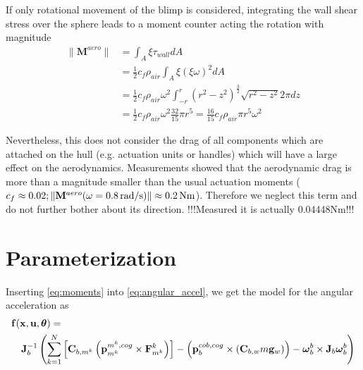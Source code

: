 If only rotational movement of the blimp is considered, integrating the wall shear stress over the sphere leads to a moment counter acting the rotation with magnitude
\begin{align*}
\| \mathbf{M}^{aero} \|
&= \int_A \xi \tau_{wall} dA \\
&= \frac{1}{2} c_f \rho_{air} \int_A \xi (\xi \omega)^2 dA \\
&= \frac{1}{2} c_f \rho_{air} \omega^2 \int_{-r}^{r} (r^2-z^2)^{\frac{3}{2}} \sqrt{r^2-z^2} 2\pi dz \\
&= \frac{1}{2} c_f \rho_{air} \omega^2 \frac{32}{15} \pi r^5
 = \frac{16}{15} c_f \rho_{air} \pi r^5 \omega^2
\end{align*}

Nevertheless, this does not consider the drag of all components which are attached on the hull (e.g. actuation units or handles) which will have a large effect on the aerodynamics.
Measurements showed that the aerodynamic drag is more than a magnitude smaller than the usual actuation moments ($c_f \approx 0.02; \|\mathbf{M}^{aero}(\omega = \unit[0.8]{rad/s})\| \approx \unit[0.2]{Nm}$). Therefore we neglect this term and do not further bother about its direction.
!!!Measured it is actually 0.04448Nm!!!

%
%

\section{Parameterization}
Inserting \cref{eq:moments} into \cref{eq:angular_accel}, we get the model for the angular acceleration as
\begin{align}
\lefteqn{ \mathbf{f}(\mathbf{x}, \mathbf{u}, \boldsymbol{\theta}) = {} \label{eq:sys_mod} }\\
& & {} \mathbf{J}_b^{-1} \left( 
\sum_{k=1}^N  \left[  \mathbf{C}_{b,m^k} \left( \mathbf{p}^{m^k,cog}_{m^k} \times \mathbf{F}^k_{m^k} \right)  \right]
-
\left( \mathbf{p}^{cob,cog}_b \times (\mathbf{C}_{b,w}m\mathbf{g}_w) \right)
- \boldsymbol{\omega}_b^b \times \mathbf{J}_b \boldsymbol{\omega}_b^b \right) \nonumber
\end{align}

